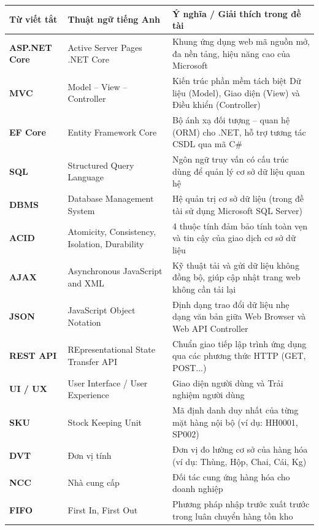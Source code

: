 \documentclass[12pt,a4paper]{report}
\renewcommand{\_}{\textunderscore\allowbreak}
\begin{document}
\begin{table}[H]
\centering
\small
\renewcommand{\arraystretch}{1.3}
\begin{tabularx}{\textwidth}{|>{\bfseries}p{2.5cm}|p{4.5cm}|Y|}
\hline
{}
Từ viết tắt & Thuật ngữ tiếng Anh & Ý nghĩa / Giải thích trong đề tài \\
\hline
ASP.NET Core & Active Server Pages .NET Core & Khung ứng dụng web mã nguồn mở, đa nền tảng, hiệu năng cao của Microsoft \\
\hline
MVC & Model -- View -- Controller & Kiến trúc phần mềm tách biệt Dữ liệu (Model), Giao diện (View) và Điều khiển (Controller) \\
\hline
EF Core & Entity Framework Core & Bộ ánh xạ đối tượng -- quan hệ (ORM) cho .NET, hỗ trợ tương tác CSDL qua mã C\# \\
\hline
SQL & Structured Query Language & Ngôn ngữ truy vấn có cấu trúc dùng để quản lý cơ sở dữ liệu quan hệ \\
\hline
DBMS & Database Management System & Hệ quản trị cơ sở dữ liệu (trong đề tài sử dụng Microsoft SQL Server) \\
\hline
ACID & Atomicity, Consistency, Isolation, Durability & 4 thuộc tính đảm bảo tính toàn vẹn và tin cậy của giao dịch cơ sở dữ liệu \\
\hline
AJAX & Asynchronous JavaScript and XML & Kỹ thuật tải và gửi dữ liệu không đồng bộ, giúp cập nhật trang web không cần tải lại \\
\hline
JSON & JavaScript Object Notation & Định dạng trao đổi dữ liệu nhẹ dạng văn bản giữa Web Browser và Web API Controller \\
\hline
REST API & REpresentational State Transfer API & Chuẩn giao tiếp lập trình ứng dụng qua các phương thức HTTP (GET, POST...) \\
\hline
UI / UX & User Interface / User Experience & Giao diện người dùng và Trải nghiệm người dùng \\
\hline
SKU & Stock Keeping Unit & Mã định danh duy nhất của từng mặt hàng nội bộ (ví dụ: HH0001, SP002) \\
\hline
DVT & Đơn vị tính & Đơn vị đo lường cơ sở của hàng hóa (ví dụ: Thùng, Hộp, Chai, Cái, Kg) \\
\hline
NCC & Nhà cung cấp & Đối tác cung ứng hàng hóa cho doanh nghiệp \\
\hline
FIFO & First In, First Out & Phương pháp nhập trước xuất trước trong luân chuyển hàng tồn kho \\
\hline
\end{tabularx}
\label{tab:danh_muc_viet_tat}
\end{table}
\end{document}
